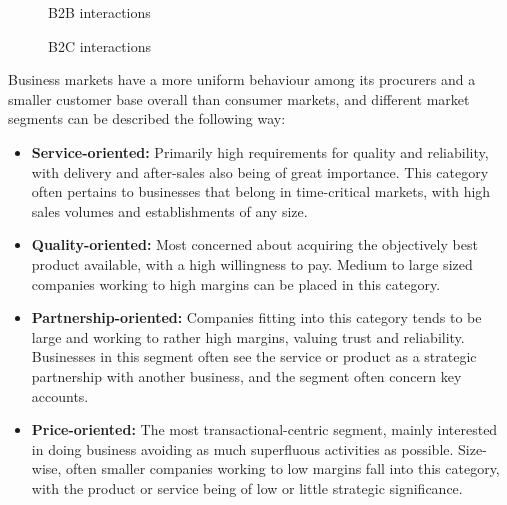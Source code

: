 \begin{figure}
    \centering
    \caption{B2B interactions}
    \label{fig:b2b}
\end{figure}


\begin{figure}
    \centering
    \caption{B2C interactions}
    \label{fig:b2c}
\end{figure}

Business markets have a more uniform behaviour among its procurers and a smaller customer base overall than consumer markets, and different market segments can be described the following way:
\begin{itemize}
    \item \textbf{Service-oriented: }Primarily high requirements for quality and reliability, with delivery and after-sales also being of great importance. This category often pertains to businesses that belong in time-critical markets, with high sales volumes and establishments of any size.
    \item \textbf{Quality-oriented: }Most concerned about acquiring the objectively best product available, with a high willingness to pay. Medium to large sized companies working to high margins can be placed in this category.
    \item \textbf{Partnership-oriented: }Companies fitting into this category tends to be large and working to rather high margins, valuing trust and reliability. Businesses in this segment often see the service or product as a strategic partnership with another business, and the segment often concern key accounts.
    \item \textbf{Price-oriented: }The most transactional-centric segment, mainly interested in doing business avoiding as much superfluous activities as possible. Size-wise, often smaller companies working to low margins fall into this category, with the product or service being of low or little strategic significance.
\end{itemize}


